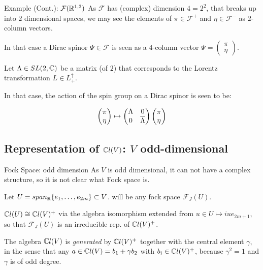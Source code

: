 \begin{frame}{Example (Cont.): $\mathcal F(\mathbb R^{1, 3})$} %
    As $\mathcal F$ has (complex) dimension $4 = 2^2$, that breaks up into $2$ dimensional spaces, we may see the elements of $\pi \in \mathcal F^+$ and $\eta \in \mathcal F^-$ as $2$-column vectors. 
    
    In that case a Dirac spinor $\Psi \in \mathcal F$ is seen as a $4$-column vector $\Psi = \begin{pmatrix}\pi \\ \eta\end{pmatrix}$.
    
    Let $\Lambda \in SL(2, \mathbb C)$ be a matrix (of $2$) that corresponds to the Lorentz transformation $L \in L^\uparrow_+$.
    
    In that case, the action of the spin group on a Dirac spinor is seen to be:
    
    \[ \begin{pmatrix}\pi \\ \eta\end{pmatrix} \mapsto \begin{pmatrix} \Lambda & 0 \\ 0 & \overline{\Lambda} \end{pmatrix} \begin{pmatrix}\pi \\ \eta\end{pmatrix}\]
\end{frame}
\subsection{Representation of $\mathbb C l(V)$: $V$ odd-dimensional}

\begin{frame}{Fock Space: odd dimension} %
    As $V$ is odd dimensional, it can not have a complex structure, so it is not clear what Fock space is.
    
    Let $U = span_\mathbb R\{e_1, \dots, e_{2m}\} \subset V$.  will be any fock space $\mathcal F_J(U)$.
    
    $\mathbb C l(U) \cong \mathbb C l(V)^+$ via the algebra isomorphism extended from $u \in U \mapsto iue_{2m+1}$, so that $\mathcal F_J(U)$ is an irreducible rep. of $\mathbb C l(V)^+$.
    
    The algebra $\mathbb C l(V)$ is \emph{generated} by $\mathbb C l(V)^+$ together with the central element $\gamma$, in the sense that any $a \in \mathbb C l(V) = b_1 + \gamma b_2$ with $b_i \in \mathbb C l(V)^+$, because $\gamma^2 = 1$ and $\gamma$ is of odd degree.
    

\end{frame}

